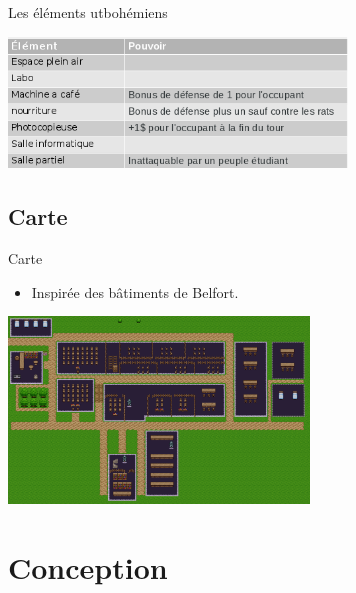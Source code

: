 \documentclass{beamer}
\begin{document}
\begin{frame}{Les éléments utbohémiens}

\begin{center}
	\includegraphics[width=9cm]{elements.png}
\end{center}

\end{frame}

	\subsection{Carte}

\begin{frame}{Carte}

\begin{itemize}
	\item Inspirée des bâtiments de Belfort.
\end{itemize} 

\begin{center}
	\includegraphics[width=8cm]{mapBelfort.png}
\end{center}

\end{frame}

	\section{Conception}
	
\end{document}
